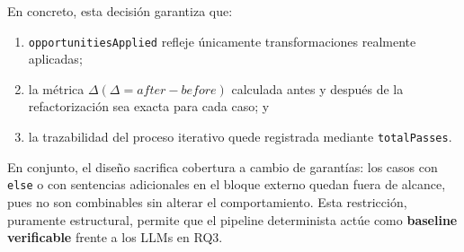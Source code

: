 En concreto, esta decisión garantiza que:

\begin{enumerate}
    \item \lstinline|opportunitiesApplied| refleje únicamente transformaciones realmente aplicadas;
    \item la métrica $\Delta (\Delta = after - before)$ calculada antes y después de la refactorización sea exacta para cada caso; y
    \item la trazabilidad del proceso iterativo quede registrada mediante \lstinline|totalPasses|.
\end{enumerate}

En conjunto, el diseño sacrifica cobertura a cambio de garantías: los casos con
\lstinline|else| o con sentencias adicionales en el bloque externo quedan fuera
de alcance, pues no son combinables sin alterar el comportamiento. Esta
restricción, puramente estructural, permite que el pipeline determinista actúe
como \textbf{baseline verificable} frente a los LLMs en RQ3.
